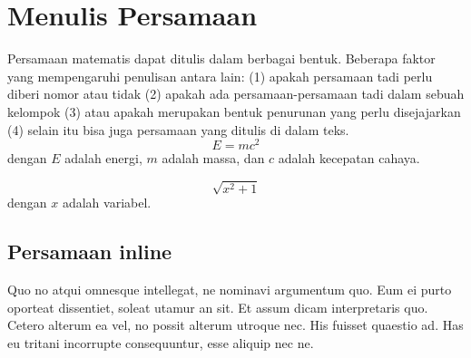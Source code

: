 \section{Menulis Persamaan}
\noindent Persamaan matematis dapat ditulis dalam berbagai bentuk. Beberapa faktor yang mempengaruhi penulisan antara lain: (1) apakah persamaan tadi perlu diberi nomor atau tidak (2) apakah ada persamaan-persamaan tadi dalam sebuah kelompok (3) atau apakah merupakan bentuk penurunan yang perlu disejajarkan (4) selain itu bisa juga persamaan yang ditulis di dalam teks.
\begin{equation}
E=mc^2
\end{equation}
    dengan $E$ adalah energi, $m$ adalah massa, dan $c$ adalah kecepatan cahaya.

\begin{equation}
\sqrt{x^2+1}
\end{equation}
    dengan $x$ adalah variabel.


\subsection{Persamaan inline}
\noindent Quo no atqui omnesque intellegat, ne nominavi argumentum quo. Eum ei purto oporteat dissentiet, soleat utamur an sit. Et assum dicam interpretaris quo. Cetero alterum ea vel, no possit alterum utroque nec. His fuisset quaestio ad. Has eu tritani incorrupte consequuntur, esse aliquip nec ne.
